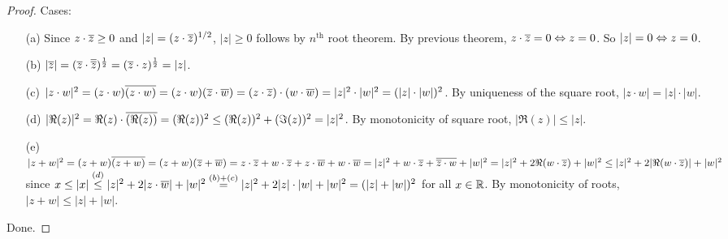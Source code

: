 \documentclass[]{article}
\begin{document}
\begin{proof}
	Cases:
	\begin{enumerate}
		\item[(a)] Since $z\cdot \overline{z} \geq 0$ and $|z| = (z\cdot\overline{z})^{1/2}$, $|z|\geq 0$ follows by $n^\text{th}$ root theorem. By previous theorem, $z\cdot \overline{z} = 0\Leftrightarrow z = 0$. So $|z|=0\Leftrightarrow z = 0$.
		\item[(b)] $|\overline{z}| = (\overline{z}\cdot \overline{\overline{z}})^\frac{1}{2} = (\overline{z}\cdot z)^\frac{1}{2} = |z|$.
		\item[(c)] $|z\cdot w|^2 = (z\cdot w)\overline{(z\cdot w)} = (z\cdot w)(\overline{z}\cdot \overline{w}) = (z\cdot \overline{z})\cdot(w\cdot\overline{w}) = |z|^2\cdot |w|^2 = (|z|\cdot|w|)^2$. By uniqueness of the square root, $|z\cdot w| = |z|\cdot |w|$. 
		\item[(d)] $|\Re(z)|^2 = \Re(z)\cdot \overline{(\Re(z))} = (\Re(z))^2 \leq (\Re(z))^2 + (\Im(z))^2 = |z|^2$. By monotonicity of square root, $|\Re(z)|\leq |z|$.
		\item[(e)] $|z+w|^2 = (z+w)\overline{(z+w)} = (z+w)(\overline{z}+\overline{w}) = z\cdot \overline{z} + w\cdot \overline{z} + z\cdot \overline{w} + w\cdot\overline{w} = |z|^2 + w\cdot\overline{z} + \overline{\overline{z} \cdot w} + |w|^2 = |z|^2 + 2\Re(w\cdot \overline{z}) + |w|^2 \leq |z|^2 + 2|\Re(w\cdot \overline{z})| + |w|^2$ since $x\leq |x| \overset{(d)}{\leq} |z|^2 + 2|z\cdot\overline{w}| + |w|^2 \overset{(b)+(c)}{=} |z|^2 + 2|z|\cdot|w| + |w|^2 = (|z|+|w|)^2$ for all $x\in\mathbb{R}$. By monotonicity of roots, $|z+w| \leq |z| + |w|$.
	\end{enumerate}
	Done.
\end{proof}
\end{document}
